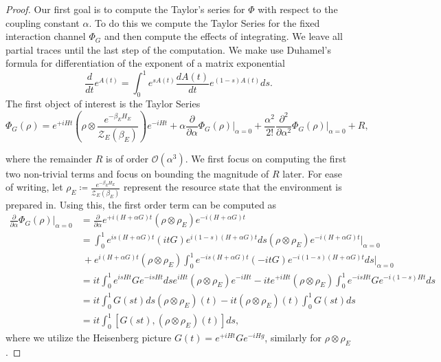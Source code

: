 \documentclass{article}
\newcommand{\parens}[1]{\left( #1 \right)}
\newcommand{\bigo}[1]{\mathcal{O}\left( #1 \right)}
\newcommand{\partfun}{\mathcal{Z}}
\begin{document}
\begin{proof}
Our first goal is to compute the Taylor's series for $\Phi$ with respect to the coupling constant $\alpha$. To do this we compute the Taylor Series for the fixed interaction channel $\Phi_G$ and then compute the effects of integrating. We leave all partial traces until the last step of the computation. We make use Duhamel's formula for differentiation of the exponent of a matrix exponential
\begin{equation}
    \frac{d}{dt} e^{A(t)} = \int_0^1 e^{s A(t)} \frac{d A(t)}{dt} e^{(1-s)A(t)} ds.
\end{equation}
The first object of interest is the Taylor Series 
\begin{equation}
	\Phi_G (\rho) = e^{+ i H t} \parens{ \rho \otimes \frac{e^{-\beta_E H_E}}{\partfun_E(\beta_E)} } e^{-i H t} + \alpha \frac{\partial}{\partial \alpha} \Phi_G (\rho) \big|_{\alpha=0} + \frac{\alpha^2}{2!} \frac{\partial^2}{\partial \alpha^2} \Phi_G (\rho) \big|_{\alpha=0} + R,
\end{equation}

 where the remainder $R$ is of order $\bigo{\alpha^3}$. We first focus on computing the first two non-trivial terms and focus on bounding the magnitude of $R$ later. 
For ease of writing, let $\rho_E \coloneqq \frac{e^{-\beta_E H_E}}{\partfun_E(\beta_E)}$ represent the resource state that the environment is prepared in. Using this, the first order term can be computed as
\begin{align}
    \frac{\partial}{\partial \alpha} \Phi_G(\rho) \bigg|_{\alpha = 0} &= \frac{\partial}{\partial \alpha} e^{+i(H + \alpha G) t} \parens{\rho \otimes \rho_E} e^{-i(H + \alpha G) t} \\
    &= \int_{0}^{1} e^{i s (H+\alpha G)t} (i t G) e^{i (1-s) (H+\alpha G)t} ds \parens{\rho \otimes \rho_E} e^{-i(H+\alpha G)t} \bigg|_{\alpha=0} \nonumber \\
    &~ + e^{i(H+\alpha G)t} \parens{\rho \otimes \rho_E} \int_{0}^1 e^{-i s (H+\alpha G) t} (- i t G) e^{-i (1-s) (H+\alpha G)t} ds \bigg|_{\alpha = 0} \label{eq:first_order_alpha_derivative}\\
    &= i t \int_0^1 e^{i s H t} G e^{-i s H t} ds e^{i H t} \parens{\rho \otimes \rho_E} e^{-i H t} - i t e^{+i H t} \parens{\rho \otimes \rho_E} \int_0^1 e^{-is H t} G e^{-i(1-s) Ht} ds \\
    &= i t \int_0^1 G(s t) ds \parens{\rho \otimes \rho_E}(t) - it \parens{\rho \otimes \rho_E}(t) \int_0^1 G(s t) ds \\
    &= i t \int_0^1 [G(s t), \parens{\rho \otimes \rho_E}(t)] ds,
\end{align}
where we utilize the Heisenberg picture $G(t) = e^{+i H t} G e^{-i H g}$, similarly for $\rho \otimes \rho_E$.


\end{proof}
\end{document}
